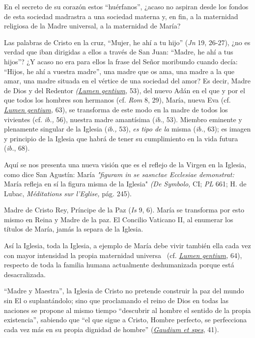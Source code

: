 En el secreto de su corazón estos ``huérfanos'', ¿acaso no aspiran desde
los fondos de esta sociedad madrastra a una sociedad materna y, en fin,
a la maternidad religiosa de la Madre universal, a la maternidad de
María?

Las palabras de Cristo en la cruz, ``Mujer, he ahí a tu hijo''
(\emph{Jn} 19, 26-27), ¿no es verdad que iban dirigidas a ellos a través
de San Juan: ``Madre, he ahí a tus hijos''? ¿Y acaso no era para ellos
la frase del Señor moribundo cuando decía: ``Hijos, he ahí a vuestra
madre'', una madre que os ama, una madre a la que amar, una madre
situada en el vértice de una sociedad del amor? Es decir, Madre de Dios
y del Redentor
\emph{(\href{http://www.vatican.va/archive/hist_councils/ii_vatican_council/documents/vat-ii_const_19641121_lumen-gentium_sp.html}{Lumen
		gentium},} 53), del nuevo Adán en el que y por el que todos los hombres
son hermanos (cf. \emph{Rom} 8, 29), María, nueva Eva (cf.
\emph{\href{http://www.vatican.va/archive/hist_councils/ii_vatican_council/documents/vat-ii_const_19641121_lumen-gentium_sp.html}{Lumen
		gentium},} 63), se transforma de este modo en la madre de todos los
vivientes (cf. \emph{ib.,} 56), nuestra madre amantísima (\emph{ib}.,
53). Miembro eminente y plenamente singular de la Iglesia (\emph{ib.,}
53), \emph{es tipo de la} misma (\emph{ib.}, 63); es imagen y principio
de la Iglesia que habrá de tener su cumplimiento en la vida futura
(\emph{ib.}, 68).

Aquí se nos presenta una nueva visión que es el reflejo de la Virgen en
la Iglesia, como dice San Agustín: María \emph{"figuram in se sasnctae
	Ecclesiae demonstrat:} María refleja en sí la figura misma de la
Iglesia" \emph{(De Symbolo,} CI; \emph{PL} 661; H. de Lubac,
\emph{Méditations sur l'Eglise,} pág. 245).

Madre de Cristo Rey, Príncipe de la Paz (\emph{Is} 9, 6). María se
transforma por esto mismo en Reina y Madre de la paz. El Concilio
Vaticano II, al enumerar los títulos de María, jamás la separa de la
Iglesia.

Así la Iglesia, toda la Iglesia, a ejemplo de María debe vivir también
ella cada vez con mayor intensidad la propia maternidad universa
\emph{~}(cf.
\emph{\href{http://www.vatican.va/archive/hist_councils/ii_vatican_council/documents/vat-ii_const_19641121_lumen-gentium_sp.html}{Lumen
		gentium},} 64), \emph{} respecto de toda la familia humana actualmente
deshumanizada porque está desacralizada.

``Madre y Maestra'', la Iglesia de Cristo no pretende construir la paz
del mundo sin El o suplantándolo; sino que proclamando el reino de Dios
en todas las naciones se propone al mismo tiempo ``descubrir al hombre
el sentido de la propia existencia'', sabiendo que ``el que sigue a
Cristo, Hombre perfecto, se perfecciona cada vez más en su propia
dignidad de hombre''
(\emph{\href{http://www.vatican.va/archive/hist_councils/ii_vatican_council/documents/vat-ii_const_19651207_gaudium-et-spes_sp.html}{Gaudium
		et spes}}, 41).

